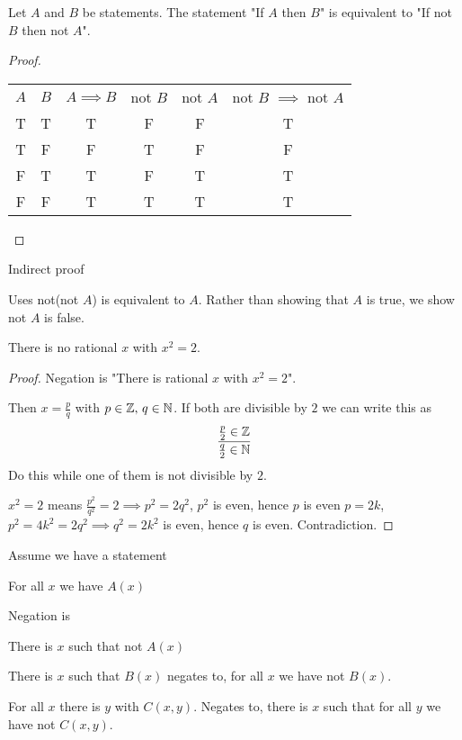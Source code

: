 \documentclass[10pt, a4paper]{article}
\begin{document}
\begin{theorem}
    Let $A$ and $B$ be statements. The statement "If $A$ then $B$" is equivalent to "If not $B$ then not $A$".
    \begin{proof}
        \begin{table}[H]
            \centering
            \begin{tabular}{cccccc}
                $A$ & $B$ & $A \implies B$ & not $B$ & not $A$ & not $B$ $\implies$ not $A$ \\
                 T & T & T & F & F & T \\
                 T & F & F & T & F & F \\
                 F & T & T & F & T & T \\
                 F & F & T & T & T & T \\
            \end{tabular}
        \end{table}
    \end{proof}
\end{theorem}

Indirect proof

Uses not(not $A$) is equivalent to $A$. Rather than showing that $A$ is true, we show not $A$ is false.
\begin{example}
    There is no rational $x$ with $x ^ 2 = 2$.
    \begin{proof}
        Negation is "There is rational $x$ with $x ^ 2 = 2$".

        Then $x = \frac{p}{q}$ with $p \in \mathbb{Z},\, q \in \mathbb{N}$. If both are divisible by $2$ we can write this as
        \[
        \frac{\frac{p}{2} \in \mathbb{Z}}{\frac{q}{2} \in \mathbb{N}}
        \]
        Do this while one of them is not divisible by $2$.

        $x ^ 2 = 2$ means $\frac{p ^ 2}{q ^ 2} = 2 \implies p ^ 2 = 2q ^ 2$, $p ^ 2$ is even, hence $p$ is even $p = 2k$, $p ^ 2 = 4k ^ 2 = 2q ^ 2 \implies q ^ 2 = 2k ^ 2$ is even, hence $q$ is even. Contradiction.
    \end{proof}
\end{example}

Assume we have a statement

For all $x$ we have $A(x)$

Negation is

There is $x$ such that not $A(x)$

There is $x$ such that $B(x)$ negates to, for all $x$ we have not $B(x)$.

For all $x$ there is $y$ with $C(x, y)$. Negates to, there is $x$ such that for all $y$ we have not $C(x, y)$.
\end{document}
